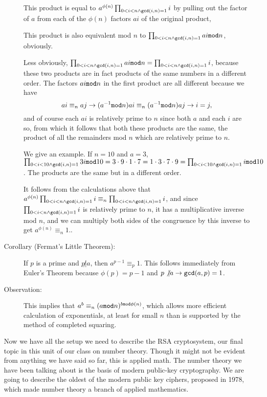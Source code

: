 \documentclass[12pt]{article}
\begin{document}
\begin{description}
This product is equal to $a^{\phi(n)}\prod_{0<i<n \wedge {\tt gcd}(i,n)=1} i$ by pulling out the factor of $a$ from each of the $\phi(n)$ factors $ai$ of the original product,

This product is also equivalent mod $n$ to  $\prod_{0<i<n \wedge {\tt gcd}(i,n)=1} ai{\tt mod}n$, obviously.

Less obviously, $\prod_{0<i<n \wedge {\tt gcd}(i,n)=1} ai{\tt mod}n = \prod_{0<i<n \wedge {\tt gcd}(i,n)=1} i$,
because these two products are in fact products of the same numbers in a different order.  The factors $ai{\tt mod}n$ in the first product are all different because we have $$ai \equiv_n aj \rightarrow (a^{-1}{\tt mod}n)ai \equiv_n (a^{-1}{\tt mod}n)aj \rightarrow i=j,$$ and of course each $ai$ is relatively prime to $n$ since both $a$ and each $i$ are so, from which it follows that both these products are the same, the product of all the remainders mod $n$ which are relatively prime to $n$.

We give an example.  If $n=10$ and $a=3$, $\prod_{0<i<10 \wedge {\tt gcd}(i,n)=1} 3i{\tt mod}10 = 3\cdot9\cdot1\cdot 7 = 1\cdot3\cdot7\cdot 9 =\prod_{0<i<10 \wedge {\tt gcd}(i,n)=1} i{\tt mod}10$.  The products are the same but in a different order.

It follows from the calculations above that $a^{\phi(n)}\prod_{0<i<n \wedge {\tt gcd}(i,n)=1} i \equiv_n \prod_{0<i<n \wedge {\tt gcd}(i,n)=1} i$, and since $\prod_{0<i<n \wedge {\tt gcd}(i,n)=1} i$ is relatively prime to $n$, it has a multiplicative inverse mod $n$, and we can multiply both sides of the congruence by this inverse to get $a^{\phi(n)} \equiv_n 1$..

\item[Corollary (Fermat's Little Theorem):]  If $p$ is a prime and $p \not| a$, then $a^{p-1} \equiv_p 1$.  This follows immediately from Euler's Theorem because $\phi(p) = p-1$ and $p \not| a \rightarrow {\tt gcd}(a,p)=1$.

\item[Observation:]  This implies that $a^b \equiv_n (a {\tt mod} n)^{b {\tt mod} \phi(n)}$, which allows more efficient calculation of exponentials, at least for small $n$ than is supported by the method of completed squaring.


\end{description}

Now we have all the setup we need to describe the RSA cryptosystem, our final topic in this unit of our class on number theory.  Though it might not be evident from anything we have said so far, this is applied math.  The number theory we have been talking about is the basis of modern public-key cryptography.  We are going to describe the oldest of the modern public key ciphers, proposed in 1978, which made number theory a branch of applied mathematics.
\end{document}
